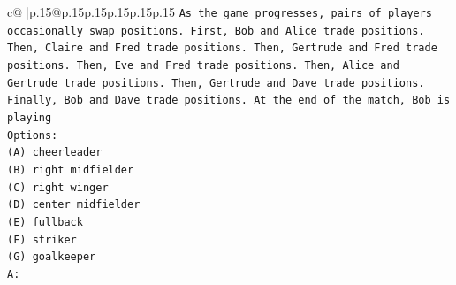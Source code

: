 \documentclass{article}
\begin{document}
{\begin{supertabular}{c@{$\;$}|p{.15\linewidth}@{}p{.15\linewidth}p{.15\linewidth}p{.15\linewidth}p{.15\linewidth}p{.15\linewidth}}
{{{\texttt{As the game progresses, pairs of players occasionally swap positions. First, Bob and Alice trade positions. Then, Claire and Fred trade positions. Then, Gertrude and Fred trade positions. Then, Eve and Fred trade positions. Then, Alice and Gertrude trade positions. Then, Gertrude and Dave trade positions. Finally, Bob and Dave trade positions. At the end of the match, Bob is playing} \\
\texttt{Options:} \\
\texttt{(A) cheerleader} \\
\texttt{(B) right midfielder} \\
\texttt{(C) right winger} \\
\texttt{(D) center midfielder} \\
\texttt{(E) fullback} \\
\texttt{(F) striker} \\
\texttt{(G) goalkeeper} \\
\texttt{A:} \\
            }
        }
    }
     \\ \\


\end{supertabular}}
\end{document}

